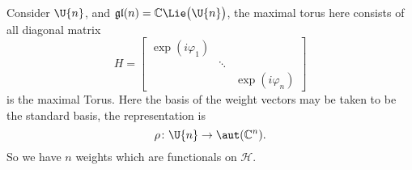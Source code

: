 Consider $\U{n}$, and
$\mathfrak{gl}(n)=\Bbb{C}\Lie\big(\U{n}\big)$, the maximal torus
here consists of all diagonal matrix
\begin{equation}
H = \begin{bmatrix}
\exp(i\varphi_{1}) &        &\\
                   & \ddots & \\
                   &        & \exp(i\varphi_{n})
\end{bmatrix}
\end{equation}
is the maximal Torus. Here the basis of the weight vectors may be
taken to be the standard basis, the representation is
\begin{equation}
\rho\colon\U{n}\to\aut(\Bbb{C}^{n}).
\end{equation}
So we have $n$ weights which are functionals on $\mathscr{H}$.
